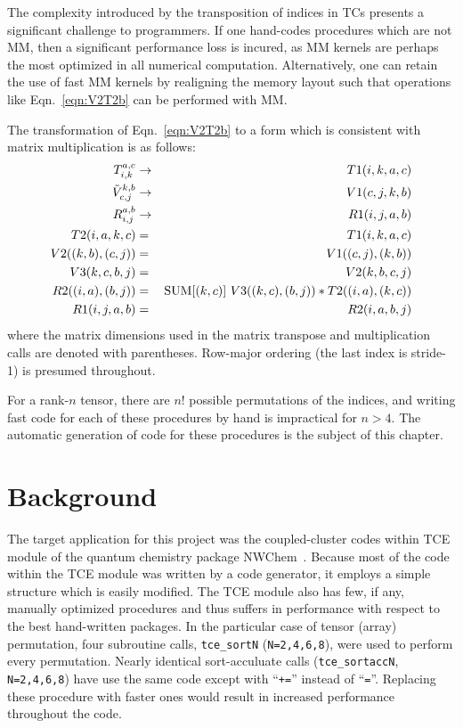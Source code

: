 \documentclass[aps,preprint,groupedaddress]{revtex4-1}
\begin{document}
The complexity introduced by the transposition of indices in TCs presents a significant challenge to programmers.  If one hand-codes procedures which are not MM, then a significant performance loss is incured, as MM kernels are perhaps the most optimized in all numerical computation.  Alternatively, one can retain the use of fast MM kernels by realigning the memory layout such that operations like Eqn.~\ref{eqn:V2T2b} can be performed with MM.

The transformation of Eqn.~\ref{eqn:V2T2b} to a form which is consistent with matrix multiplication is as follows:
\begin{eqnarray}\label{eqn:transform_V2T2b}
 T^{a,c}_{i,k} &\rightarrow& T1(i,k,a,c) \\
 \tilde{V}^{k,b}_{c,j} &\rightarrow& V1(c,j,k,b) \\
 R^{a,b}_{i,j} &\rightarrow& R1(i,j,a,b) \\
 T2(i,a,k,c) &=& T1(i,k,a,c) \\
 V2((k,b),(c,j)) &=& V1((c,j),(k,b)) \\
 V3(k,c,b,j) &=& V2(k,b,c,j) \\
 R2((i,a),(b,j)) &=& {\rm SUM}[(k,c)]~V3((k,c),(b,j))*T2((i,a),(k,c)) \\
 R1(i,j,a,b) &=& R2(i,a,b,j)
\end{eqnarray}
where the matrix dimensions used in the matrix transpose and multiplication calls are denoted with parentheses.  Row-major ordering (the last index is stride-1) is presumed throughout.

For a rank-$n$ tensor, there are $n!$ possible permutations of the indices, and writing fast code for each of these procedures by hand is impractical for $n>4$.  The automatic generation of code for these procedures is the subject of this chapter.

\section{Background}

The target application for this project was the coupled-cluster codes within TCE module of the quantum chemistry package NWChem~\cite{NWChem}.  Because most of the code within the TCE module was written by a code generator, it employs a simple structure which is easily modified.  The TCE module also has few, if any, manually optimized procedures and thus suffers in performance with respect to the best hand-written packages.  In the particular case of tensor (array) permutation, four subroutine calls, \texttt{tce\_sortN} (\texttt{N=2,4,6,8}), were used to perform every permutation.  Nearly identical sort-acculuate calls (\texttt{tce\_sortaccN}, \texttt{N=2,4,6,8}) have use the same code except with ``\texttt{+=}'' instead of ``\texttt{=}''.  Replacing these procedure with faster ones would result in increased performance throughout the code.
\end{document}
